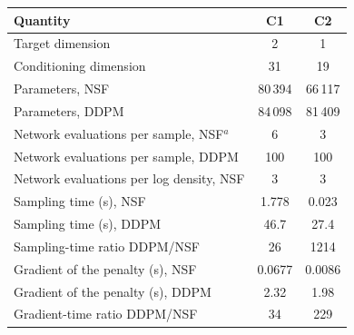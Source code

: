 \begin{tabular}{lcc}
\toprule
Quantity & C1 & C2\\
\midrule
Target dimension & 2 & 1\\
Conditioning dimension & 31 & 19\\
Parameters, NSF & 80\,394 & 66\,117\\
Parameters, DDPM & 84\,098 & 81\,409\\
Network evaluations per sample, NSF$^{a}$ & 6 & 3\\
Network evaluations per sample, DDPM & 100 & 100\\
Network evaluations per log density, NSF & 3 & 3\\
Sampling time (s), NSF & 1.778 & 0.023\\
Sampling time (s), DDPM & 46.7 & 27.4\\
Sampling-time ratio DDPM/NSF & 26 & 1214\\
Gradient of the penalty (s), NSF & 0.0677 & 0.0086\\
Gradient of the penalty (s), DDPM & 2.32 & 1.98\\
Gradient-time ratio DDPM/NSF & 34 & 229\\
\bottomrule
\end{tabular}

